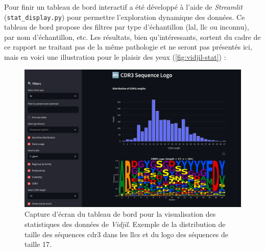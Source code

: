 Pour finir un tableau de bord interactif a été développé à l'aide de
\textit{Streamlit} (\texttt{stat\_display.py}) pour permettre l'exploration
dynamique des données. Ce tableau de bord propose des filtres par type
d'échantillon (\gls{lal}, \gls{llc} ou inconnu), par nom d'échantillon, etc.
Les résultats, bien qu'intéressants, sortent du cadre de ce rapport ne traitant
pas de la même pathologie et ne seront pas présentés ici, mais en voici une
illustration pour le plaisir des yeux (\autoref{fig:vidjil-stat}) :

\begin{figure}[H]
    \centering
    \includegraphics[width=1\textwidth]{images/vidjil_stat.png}
    \caption{
        Capture d'écran du tableau de bord pour la visualisation des statistiques des données de \textit{Vidjil}.
        Exemple de la distribution de taille des séquences \gls{cdr}3 dans les \glspl{llc} et du logo des séquences
        de taille 17.
    }
    \label{fig:vidjil-stat}
\end{figure}
